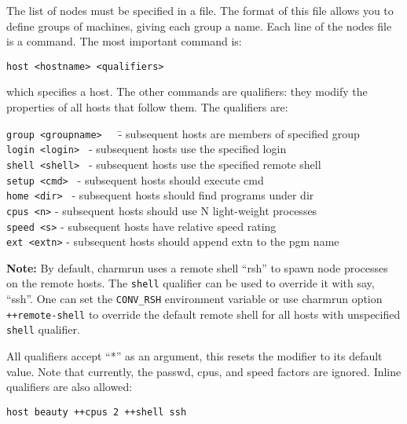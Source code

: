 \begin{itemize}
The list of nodes must be specified in a file.  The format of this file
allows you to define groups of machines, giving each group a name.
Each line of the nodes file is a command.  The most important command
is:

\begin{verbatim}
host <hostname> <qualifiers>
\end{verbatim}

which specifies a host.  The other commands are qualifiers: they modify
the properties of all hosts that follow them.  The qualifiers are:


\begin{tabbing}
{\tt group <groupname>}~~~\= - subsequent hosts are members of specified group\\
{\tt login <login>  }     \> - subsequent hosts use the specified login\\
{\tt shell <shell>  }     \> - subsequent hosts use the specified remote 
shell\\
{\tt setup <cmd>  }       \> - subsequent hosts should execute cmd\\
{\tt home <dir> }         \> - subsequent hosts should find programs under dir\\
{\tt cpus <n>}            \> - subsequent hosts should use N light-weight processes\\
{\tt speed <s>}           \> - subsequent hosts have relative speed rating\\
{\tt ext <extn>}          \> - subsequent hosts should append extn to the pgm name\\
\end{tabbing}

{\bf Note:}
By default, charmrun uses a remote shell ``rsh'' to spawn node processes
on the remote hosts. The {\tt shell} qualifier can be used to override
it with say, ``ssh''. One can set the {\tt CONV\_RSH} environment variable
or use charmrun option {\tt ++remote-shell} to override the default remote 
shell for all hosts with unspecified {\tt shell} qualifier.

All qualifiers accept ``*'' as an argument, this resets the modifier to
its default value.  Note that currently, the passwd, cpus, and speed
factors are ignored.  Inline qualifiers are also allowed:

\begin{verbatim}
host beauty ++cpus 2 ++shell ssh
\end{verbatim}


\end{itemize}
